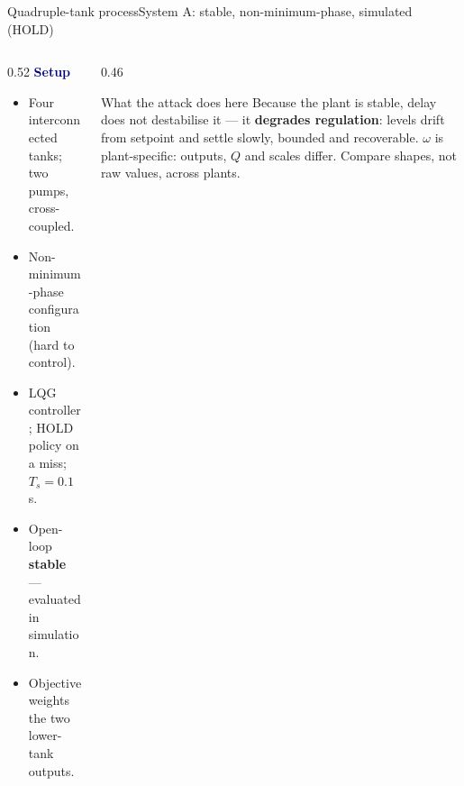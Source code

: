 \documentclass[8pt,aspectratio=169]{beamer}
\gdef\CPSOrigin{PAPER}%
\gdef\CPSSourceContext{}%
\begin{document}
\begin{frame}{Quadruple-tank process}{System A: stable, non-minimum-phase, simulated (HOLD)}
\gdef\CPSSourceContext{}
\gdef\CPSOrigin{PAPER}
  \begin{columns}[T]
    \begin{column}{0.52\textwidth}
      \textbf{\textcolor{navy}{Setup}}
      \begin{itemize}
        \item Four interconnected tanks; two pumps, cross-coupled.
        \item Non-minimum-phase configuration (hard to control).
        \item LQG controller; HOLD policy on a miss; $T_s = 0.1$\,s.
        \item Open-loop \textbf{stable} --- evaluated in simulation.
        \item Objective weights the two lower-tank outputs.
      \end{itemize}
    \end{column}
    \begin{column}{0.46\textwidth}
      \begin{block}{What the attack does here}
        Because the plant is stable, delay does not destabilise it --- it \textbf{degrades regulation}: levels drift from setpoint and settle slowly, bounded and recoverable. $\omega$ is plant-specific: outputs, $Q$ and scales differ. Compare shapes, not raw values, across plants.
      \end{block}
    \end{column}
  \end{columns}
\end{frame}
\end{document}
